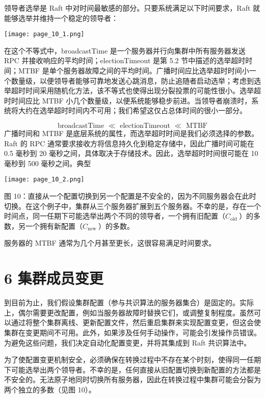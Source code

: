\documentclass[12pt,a4paper]{report} %
\begin{document}
领导者选举是 Raft 中对时间最敏感的部分。只要系统满足以下时间要求，Raft 就能够选举并维持一个稳定的领导者：\begin{center}
\texttt{[image: page\_10\_1.png]}
\end{center}
\begin{center}
在这个不等式中，broadcastTime 是一个服务器并行向集群中所有服务器发送 RPC 并接收响应的平均时间；electionTimeout 是第 5.2 节中描述的选举超时时间；MTBF 是单个服务器故障之间的平均时间。广播时间应比选举超时时间小一个数量级，以便领导者能够可靠地发送心跳消息，防止追随者启动选举；考虑到选举超时时间采用随机化方法，该不等式也使得出现分裂投票的可能性很小。选举超时时间应比 MTBF 小几个数量级，以便系统能够稳步前进。当领导者崩溃时，系统将大约在选举超时时间内不可用；我们希望这仅占总体时间的很小一部分。
\end{center}$$\text { broadcastTime } \ll \text { electionTimeout } \ll \text { MTBF }$$ 广播时间和 MTBF 是底层系统的属性，而选举超时时间是我们必须选择的参数。Raft 的 RPC 通常要求接收方将信息持久化到稳定存储中，因此广播时间可能在 0.5 毫秒到 20 毫秒之间，具体取决于存储技术。因此，选举超时时间很可能在 10 毫秒到 500 毫秒之间。典型 

\begin{center}
\texttt{[image: page\_10\_2.png]}
\end{center}
\begin{center} 图 10：直接从一个配置切换到另一个配置是不安全的，因为不同服务器会在此时切换。在这个例子中，集群从三个服务器扩展到五个服务器。不幸的是，存在一个时间点，同一任期下可能选举出两个不同的领导者，一个拥有旧配置（$C_{\text {old }}$）的多数，另一个拥有新配置（$C_{\text {new }}$）的多数。

\end{center} 服务器的 MTBF 通常为几个月甚至更长，这很容易满足时间要求。

\section*{6 集群成员变更}

到目前为止，我们假设集群配置（参与共识算法的服务器集合）是固定的。实际上，偶尔需要更改配置，例如当服务器故障时替换它们，或调整复制程度。虽然可以通过将整个集群离线、更新配置文件，然后重启集群来实现配置变更，但这会使集群在变更期间不可用。此外，如果涉及任何手动操作，可能会引发操作员错误。为避免这些问题，我们决定自动化配置变更，并将其集成到 Raft 共识算法中。

为了使配置变更机制安全，必须确保在转换过程中不存在某个时刻，使得同一任期下可能选举出两个领导者。不幸的是，任何直接从旧配置切换到新配置的方法都是不安全的。无法原子地同时切换所有服务器，因此在转换过程中集群可能会分裂为两个独立的多数（见图 10）。
\end{document}
